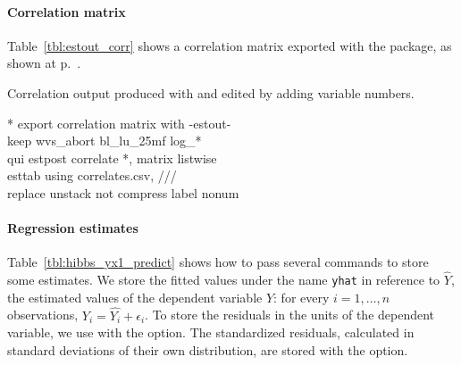 %
\paragraph{Correlation matrix}%
  Table~\ref{tbl:estout_corr} shows a correlation matrix exported with the  package, as shown at p.~\pageref{tbl:correlate_export}.%

\begin{fullwidth}
	\begin{table}
		\footnotesize
    
		\caption{Correlation output produced with  and edited by adding variable numbers.}
		\label{tbl:estout_corr}
	\end{table}
\end{fullwidth}

\begin{docspec}
  * export correlation matrix with -estout-\\
  keep wvs\_abort bl\_lu\_25mf log\_*\\
  qui estpost correlate *, matrix listwise\\
  esttab using correlates.csv, ///\\%
    replace unstack not compress label nonum
\end{docspec}

%
%
%
\paragraph{Regression estimates}

Table~\ref{tbl:hibbs_yx1_predict} shows how to pass several  commands to store some estimates. We store the fitted values under the name \texttt{yhat} in reference to $\hat{Y}$, the estimated values of the dependent variable $Y$: for every $i=1, \ldots, n$ observations, $Y_i = \hat{Y_i} + \epsilon_i$. To store the residuals in the units of the dependent variable, we use  with the  option. The standardized residuals, calculated in standard deviations of their own distribution, are stored with the  option.


